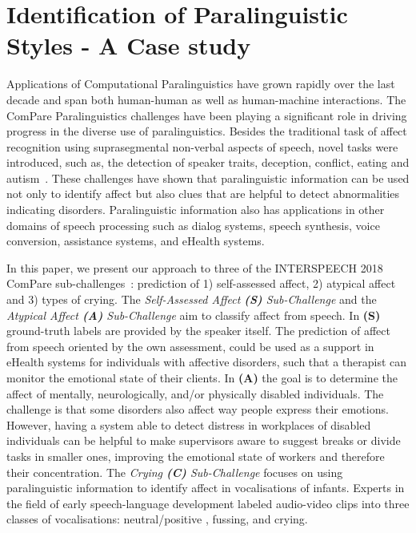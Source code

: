 
\section{Identification of Paralinguistic Styles - A Case study}

Applications of Computational Paralinguistics have grown rapidly over the last decade and span both human-human as well as human-machine interactions. The ComPare Paralinguistics challenges have been playing a significant role in driving progress in the diverse use of paralinguistics. Besides the traditional task of affect recognition using suprasegmental non-verbal aspects of speech, novel tasks were introduced, such as, the detection of speaker traits, deception, conflict, eating and autism~\cite{schuller2013interspeech,schuller2010interspeech,schuller2015interspeech,schuller2017interspeech}. These challenges have shown that paralinguistic information can be used not only  to identify affect but also clues that are helpful to detect abnormalities indicating disorders. Paralinguistic information also has applications in other domains of speech processing such as dialog systems, speech synthesis, voice conversion, assistance systems, and eHealth systems. 


In this paper, we present our approach to three of the INTERSPEECH 2018 ComPare sub-challenges~\cite{Interspeech2018}: prediction of 1) self-assessed affect, 2) atypical affect and 3) types of crying.
The \textit{Self-Assessed Affect \textbf{(S)} Sub-Challenge} and the \textit{Atypical Affect \textbf{(A)} Sub-Challenge} aim to classify affect from speech. In \textbf{(S)} ground-truth labels are provided by the speaker itself. The prediction of affect from speech oriented by the own assessment, could be used as a support in eHealth systems for individuals with affective disorders, such that a therapist can monitor the emotional state of their clients. In \textbf{(A)} the goal is to determine the affect of mentally, neurologically, and/or physically disabled individuals. The challenge is that some disorders also affect way people express their emotions. However, having a system able to detect distress in workplaces of disabled individuals can be helpful to make supervisors aware to suggest breaks or divide tasks in smaller ones, improving the emotional state of workers and therefore their concentration. The \textit{Crying \textbf{(C)} Sub-Challenge} focuses on using paralinguistic information to identify affect in vocalisations of infants. Experts in the field of early speech-language development labeled audio-video clips into three classes of vocalisations: neutral/positive , fussing, and crying.       

